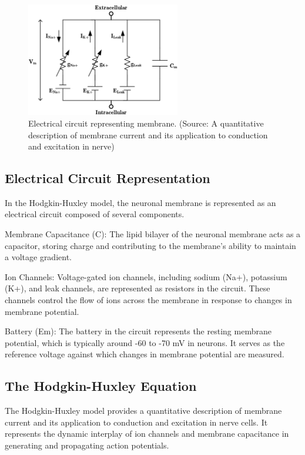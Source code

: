 \documentclass[12pt,a4paper]{report}
\begin{document}
\begin{figure}[htbp]
    \centering
    \includegraphics[width=0.6\textwidth]{./data/electrical_circuit_representing membrane.png}
    \caption{Electrical circuit representing membrane. (Source: A quantitative description of membrane current and its application to conduction and excitation in nerve\cite{Hodgkin1952})}
    \label{fig:electrical_circuit_representing membrane.}
\end{figure}

\subsection{Electrical Circuit Representation}

In the Hodgkin-Huxley model, the neuronal membrane is represented as an electrical circuit composed of several components.

Membrane Capacitance (C): The lipid bilayer of the neuronal membrane acts as a capacitor, storing charge and contributing to the membrane's ability to maintain a voltage gradient.

Ion Channels: Voltage-gated ion channels, including sodium (Na+), potassium (K+), and leak channels, are represented as resistors in the circuit. These channels control the flow of ions across the membrane in response to changes in membrane potential.

Battery (Em): The battery in the circuit represents the resting membrane potential, which is typically around -60 to -70 mV in neurons. It serves as the reference voltage against which changes in membrane potential are measured.

\subsection{The Hodgkin-Huxley Equation}

The Hodgkin-Huxley model provides a quantitative description of membrane current and its application to conduction and excitation in nerve cells. It represents the dynamic interplay of ion channels and membrane capacitance in generating and propagating action potentials.
\end{document}
